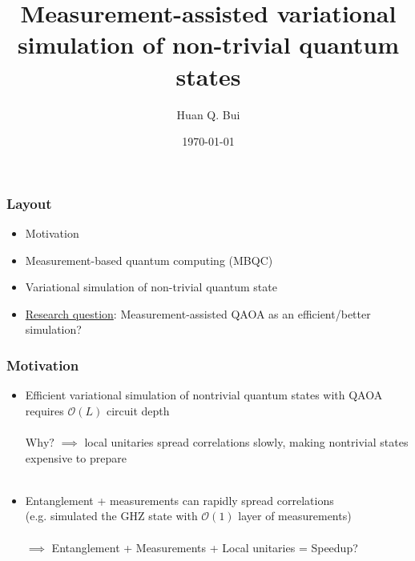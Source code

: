 \documentclass{beamer}
\title{Measurement-assisted variational simulation of non-trivial quantum states}
\author[Huan Q. Bui] %
{Huan Q. Bui}
\institute[Perimeter Institute] %
{
	
	Advisor: Timothy Hsieh
	\and
	Perimeter Institute for Theoretical Physics
}
\date{\today}
\theoremstyle{definition}
\begin{document}
 
\frame{\titlepage}






\begin{frame}

\frametitle{Layout}

\begin{itemize}
	\item Motivation
	\item Measurement-based quantum computing (MBQC)
	\item Variational simulation of non-trivial quantum state
	\item \underline{Research question}: Measurement-assisted QAOA as an efficient/better simulation?
\end{itemize}

\end{frame}




\begin{frame}


\frametitle{Motivation}


\begin{itemize}
	\item Efficient variational simulation of nontrivial quantum states with QAOA \cite{VQCS} requires $\mathcal{O}(L)$ circuit depth\\
	$\,$\\
	$\boxed{\text{Why?}}$ $\implies$ local unitaries spread correlations slowly, making nontrivial states expensive to prepare \\
	$\,$	
	
	\item Entanglement + measurements can rapidly spread correlations \\
	(e.g. simulated the GHZ state with $\mathcal{O}(1)$ layer of measurements)\\
	$\,$\\
	$\implies$ Entanglement + Measurements + Local unitaries = Speedup? 
	
\end{itemize}


\end{frame}



\end{document}
